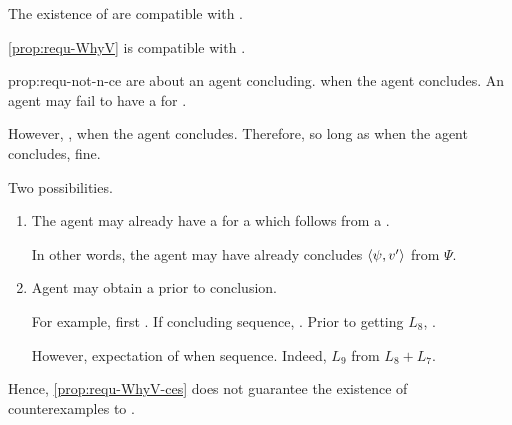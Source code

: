 \begin{note}
  The existence of  are compatible with \issueConstraint{}.

  \begin{observation}%
    \label{prop:requ-not-n-ce}%
    \autoref{prop:requ-WhyV} is compatible with \issueConstraint{}.
  \end{observation}

  \begin{motivation}{prop:requ-not-n-ce}
     are about an agent concluding.
    \fc{} when the agent concludes.
    An agent may fail to have a \wit{} for \fc{}.

    However, \issueConstraint{}, \wit{} when the agent concludes.
    Therefore, so long as \wit{} when the agent concludes, fine.

    Two possibilities.
    \begin{enumerate}
    \item
      The agent may already have a \wit{} for a \ros{} which follows from a \fc{}.

      In other words, the agent may have already concludes \(\langle \psi, v' \rangle\) from \(\Psi\).
    \item
      Agent may obtain a \wit{} prior to conclusion.

      For example, first .
      If concluding sequence, \fc{}.
      Prior to getting \(L_{8}\), \fc{}.

      However, expectation of \wit{} when sequence.
      Indeed, \(L_{9}\) from \(L_{8} + L_{7}\).
    \end{enumerate}
    \vspace{-\baselineskip}
  \end{motivation}

  \noindent%
  Hence, \autoref{prop:requ-WhyV-ces} does not guarantee the existence of counterexamples to \issueConstraint{}.
\end{note}



